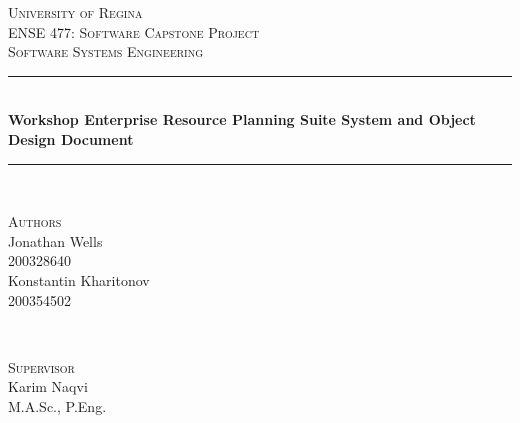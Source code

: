 \begin{titlepage} %
	\newcommand{\HRule}{\rule{\linewidth}{0.5mm}} %
	
	\center %
	
	
	\textsc{\Huge University of Regina}\\[1.5cm] %

	\textsc{\Large ENSE 477: Software Capstone Project}\\[0.5cm]
	
	\textsc{\Large Software Systems Engineering}\\[0.5cm] %
	
	
	
	
	
	\HRule\\[0.4cm]
	
	{\Huge\bfseries Workshop Enterprise Resource Planning Suite System and Object Design Document}\\[0.4cm] %
	
	\HRule\\[1.5cm]
	
	
	\begin{minipage}[t]{0.4\textwidth}
		\begin{flushleft}
			\large
			\textsc{Authors}\\
			Jonathan Wells\\
			\textsc{200328640}\\ %
			\large
			Konstantin Kharitonov\\
			\textsc{200354502} %
		\end{flushleft}
		
	\end{minipage}
	~
	\begin{minipage}[t]{0.4\textwidth}
		\begin{flushright}
			\large
			\textsc{Supervisor}\\ %
			Karim Naqvi\\
			M.A.Sc., P.Eng.\\
		\end{flushright}
	\end{minipage}
	

\end{titlepage}
